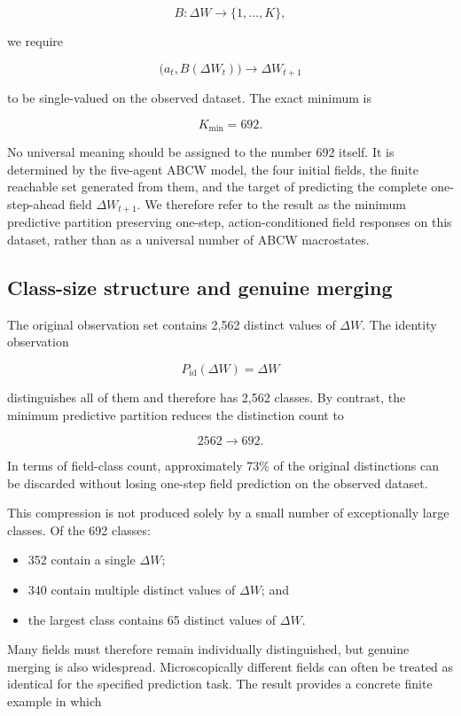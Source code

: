 \documentclass[
  11pt,
]{article}
\providecommand{\tightlist}{%
  \setlength{\itemsep}{0pt}\setlength{\parskip}{0pt}}
\begin{document}
\[{B:\Delta W\longrightarrow\lbrace1,\ldots,K\rbrace,}\]

we require

\[{\bigl(a_t,B(\Delta W_t)\bigr)\longrightarrow\Delta W_{t+1}}\]

to be single-valued on the observed dataset. The exact minimum is

\[{K_{\min}=692.}\]

No universal meaning should be assigned to the number 692 itself. It is
determined by the five-agent ABCW model, the four initial fields, the
finite reachable set generated from them, and the target of predicting
the complete one-step-ahead field \({\Delta W_{t+1}}\). We therefore
refer to the result as the minimum predictive partition preserving
one-step, action-conditioned field responses on this dataset, rather
than as a universal number of ABCW macrostates.

\hypertarget{class-size-structure-and-genuine-merging}{%
\subsection{Class-size structure and genuine
merging}\label{class-size-structure-and-genuine-merging}}

The original observation set contains 2,562 distinct values of
\({\Delta W}\). The identity observation

\[{P_{\mathrm{id}}(\Delta W)=\Delta W}\]

distinguishes all of them and therefore has 2,562 classes. By contrast,
the minimum predictive partition reduces the distinction count to

\[{2562\longrightarrow692.}\]

In terms of field-class count, approximately 73\% of the original
distinctions can be discarded without losing one-step field prediction
on the observed dataset.

This compression is not produced solely by a small number of
exceptionally large classes. Of the 692 classes:

\begin{itemize}
\tightlist
\item
  352 contain a single \({\Delta W}\);
\item
  340 contain multiple distinct values of \({\Delta W}\); and
\item
  the largest class contains 65 distinct values of \({\Delta W}\).
\end{itemize}

Many fields must therefore remain individually distinguished, but
genuine merging is also widespread. Microscopically different fields can
often be treated as identical for the specified prediction task. The
result provides a concrete finite example in which
\end{document}
